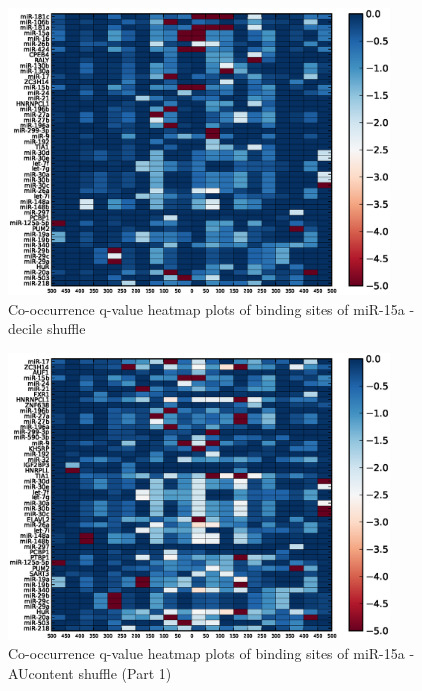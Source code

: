 \begin{figure}
   	\includegraphics[width=0.9\textwidth,clip]{appendix1/figures/miR-15a_decile_expressed_heatmap_qvalues0.eps}
   	\caption{Co-occurrence q-value heatmap plots of binding sites of miR-15a - decile shuffle}
\end{figure}
\clearpage
\begin{figure}
   	\includegraphics[width=0.9\textwidth,clip]{appendix1/figures/miR-15a_AUcontent_expressed_heatmap_qvalues0.eps}
   	\caption{Co-occurrence q-value heatmap plots of binding sites of miR-15a - AUcontent shuffle (Part 1)}
\end{figure}

